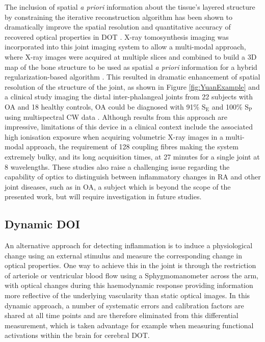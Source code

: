 \documentclass[twoside]{bhamthesis}
\theoremstyle{definition}
\begin{document}
The inclusion of spatial \textit{a priori} information about the tissue's layered structure by constraining the iterative reconstruction algorithm has been shown to dramatically improve the spatial resolution and quantitative accuracy of recovered optical properties in DOT \cite{brooksby2003near,brooksby2005combining}. X-ray tomosynthesis imaging was incorporated into this joint imaging system to allow a multi-modal approach, where X-ray images were acquired at multiple slices and combined to build a 3D map of the bone structure to be used as spatial \textit{a priori} information for a hybrid regularization-based algorithm \cite{yuan2008tomographic}. This resulted in dramatic enhancement of spatial resolution of the structure of the joint, as shown in Figure  
\ref{fig:YuanExample} and a clinical study imaging the distal inter-phalangeal joints from 22 subjects with OA and 18 healthy controls, OA could be diagnosed with 91\% $\mathrm{S_E}$ and 100\% $\mathrm{S_P}$ using multispectral CW data \cite{yuan2010image}. Although results from this approach are impressive, limitations of this device in a clinical context include the associated high ionisation exposure when acquiring volumetric X-ray images in a multi-modal approach, the requirement of 128 coupling fibres making the system extremely bulky, and its long acquisition times, at 27 minutes for a single joint at 8 wavelengths.  These studies also raise a challenging issue regarding the capability of optics to distinguish between inflammatory changes in RA and other joint diseases, such as in OA, a subject which is beyond the scope of the presented work, but will require investigation in future studies.

\subsection{Dynamic DOI}
\label{Dynamic DOI}
An alternative approach for detecting inflammation is to induce a physiological change using an external stimulus and measure the corresponding change in optical properties. One way to achieve this in the joint is through the restriction of arteriole or ventricular blood flow using a Sphygmomanometer across the arm, with optical changes during this haemodynamic response providing information more reflective of the underlying vascularity than static optical images. In this dynamic approach, a number of systematic errors and calibration factors are shared at all time points and are therefore eliminated from this differential measurement, which is taken advantage for example when measuring functional activations within the brain for cerebral DOT.
\end{document}
